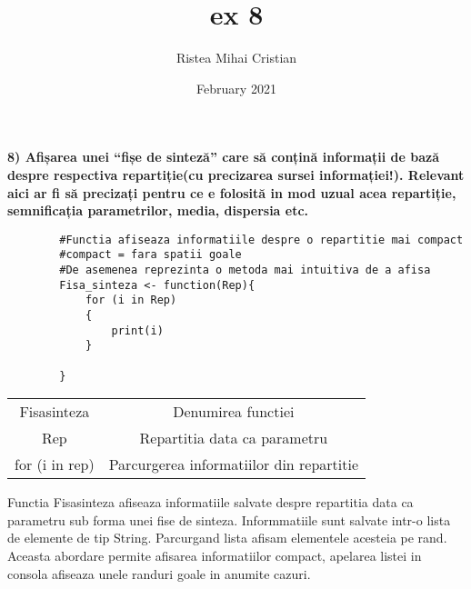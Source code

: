 \documentclass[12pt, twoside]{article}
\title{ex 8}
\author{Ristea Mihai Cristian}
\date{February 2021}
\begin{document}
	
	\textbf{8) Afișarea unei “fișe de sinteză” care să conțină informații de bază despre respectiva
		repartiție(cu precizarea sursei informației!). Relevant aici ar fi să precizați pentru ce e
		folosită in mod uzual acea repartiție, semnificația parametrilor, media, dispersia etc.}\vspace{5mm}
	
	\begin{lstlisting}
		#Functia afiseaza informatiile despre o repartitie mai compact
		#compact = fara spatii goale
		#De asemenea reprezinta o metoda mai intuitiva de a afisa
		Fisa_sinteza <- function(Rep){
			for (i in Rep)
			{
				print(i)
			}
			
		}
	\end{lstlisting}
	
	\begin{center}
		\begin{tabular}{ c c }
			Fisa\underline{\hspace{.08in}}sinteza & Denumirea functiei \\
			Rep & Repartitia data ca parametru \\
			for (i in rep) & Parcurgerea informatiilor din repartitie 
		\end{tabular}
	\end{center}
	\vspace{30mm}
	
	Functia Fisa\underline{\hspace{.08in}}sinteza afiseaza informatiile salvate despre repartitia data ca parametru sub forma unei fise de sinteza.\hfill \break
	\indent Informmatiile sunt salvate intr-o lista de elemente de tip String. Parcurgand lista afisam elementele acesteia pe rand. Aceasta abordare permite afisarea informatiilor compact, apelarea listei in consola afiseaza unele randuri goale in anumite cazuri.
	
	
\end{document}
